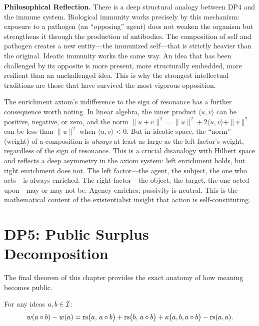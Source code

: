\begin{reflectionbox}
\textbf{Philosophical Reflection.}
There is a deep structural analogy between DP4 and the immune system.
Biological immunity works precisely by this mechanism: exposure to a
pathogen (an ``opposing'' agent) does not weaken the organism but
strengthens it through the production of antibodies. The composition of
self and pathogen creates a new entity---the immunized self---that is
strictly heavier than the original. Ideatic immunity works the same way.
An idea that has been challenged by its opposite is more present, more
structurally embedded, more resilient than an unchallenged idea. This is
why the strongest intellectual traditions are those that have survived
the most vigorous opposition.
\end{reflectionbox}

The enrichment axiom's indifference to the sign of resonance has a
further consequence worth noting. In linear algebra, the inner product
$\langle u, v \rangle$ can be positive, negative, or zero, and
the norm $\|u + v\|^2 = \|u\|^2 + 2\langle u,v\rangle + \|v\|^2$
can be less than $\|u\|^2$ when $\langle u,v \rangle < 0$. But in
ideatic space, the ``norm'' (weight) of a composition is \emph{always}
at least as large as the left factor's weight, regardless of the sign
of resonance. This is a crucial disanalogy with Hilbert space and
reflects a deep asymmetry in the axiom system: left enrichment holds,
but right enrichment does not. The left factor---the agent, the
subject, the one who acts---is always enriched. The right factor---the
object, the target, the one acted upon---may or may not be. Agency
enriches; passivity is neutral. This is the mathematical content of
the existentialist insight that action is self-constituting.

\section{DP5: Public Surplus Decomposition}

The final theorem of this chapter provides the exact anatomy of how
meaning becomes public.

\begin{theorem}
\label{thm:public-surplus}
For any ideas $a, b \in \mathcal{I}$:
\[
w(a \circ b) - w(a) =
\mathrm{rs}\bigl(a,\, a \circ b\bigr) + \mathrm{rs}\bigl(b,\, a \circ b\bigr)
+ \kappa\bigl(a, b, a \circ b\bigr) - \mathrm{rs}(a, a).
\]
\end{theorem}

